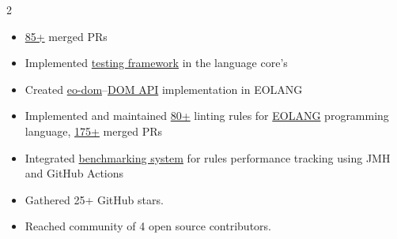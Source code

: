 \documentclass[10pt,a4paper,normalphoto]{altacv}
\begin{document}
\begin{paracol}{2}
    \begin{itemize}
      \item \href{https://github.com/objectionary/eo/pulls?q=is:pr+is:closed+author:h1alexbel}{85+} merged PRs
      \item Implemented \href{https://github.com/objectionary/eo/issues/4096}{testing framework} in the language core's
      \item Created \href{https://github.com/h1alexbel/eo-dom}{eo-dom}--\href{https://en.wikipedia.org/wiki/Document_Object_Model}{DOM API} implementation in EOLANG
    \end{itemize}
    \divider
    \begin{itemize}
      \item Implemented and maintained \href{https://www.objectionary.com/lints}{80+} linting rules for \href{https://www.eolang.org}{EOLANG} programming language, \href{https://github.com/objectionary/lints/pulls?q=is:pr+is:closed+author:h1alexbel}{175+} merged PRs
      \item Integrated \href{https://github.com/objectionary/lints?tab=readme-ov-file#benchmark}{benchmarking system} for rules performance tracking using JMH and GitHub Actions
    \end{itemize}
    \divider
    \begin{itemize}
      \item Gathered 25+ GitHub stars.
      \item Reached community of 4 open source contributors.
    \end{itemize}
    \medskip
    \switchcolumn




\end{paracol}
\end{document}
